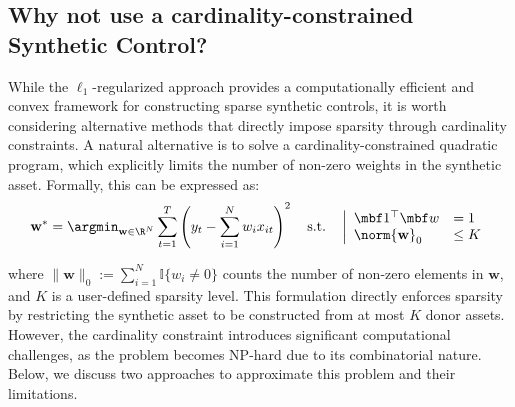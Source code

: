 \subsection{Why not use a cardinality-constrained Synthetic Control?}
\label{sec:discussion_card_constr}

While the $\ell_1$-regularized approach provides a computationally efficient and convex framework for constructing sparse synthetic controls, it is worth considering alternative methods that directly impose sparsity through cardinality constraints. A natural alternative is to solve a cardinality-constrained quadratic program, which explicitly limits the number of non-zero weights in the synthetic asset. Formally, this can be expressed as:
\begin{equation*}
\mathbf{w}^* = \argmin_{\mathbf{w} \in \R^{N}} \sum_{t=1}^T \left(y_{t} - \sum_{i=1}^N w_i x_{it}\right)^2 
\quad \text{s.t.} \quad 
\left|
\begin{array}{ll}
	\mbf 1^\top \mbf w &= 1 \\
	\norm{\mathbf{w}}_0 &\leq K
\end{array}
\right.
\end{equation*}

where $\|\mathbf{w}\|_0 := \sum_{i=1}^N \mathbb{I}\{w_i \neq 0\}$ counts the number of non-zero elements in $\mathbf{w}$, and $K$ is a user-defined sparsity level. This formulation directly enforces sparsity by restricting the synthetic asset to be constructed from at most $K$ donor assets. However, the cardinality constraint introduces significant computational challenges, as the problem becomes NP-hard due to its combinatorial nature. Below, we discuss two approaches to approximate this problem and their limitations.


